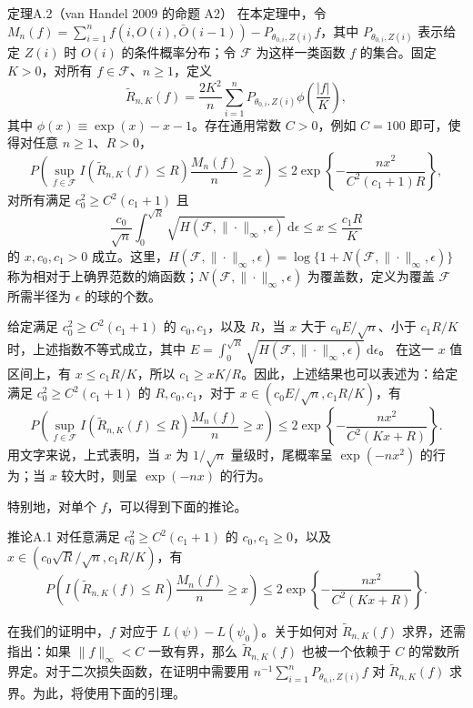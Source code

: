\begin{bookresult}{定理}{A.2（van Handel 2009 的命题 A2）}
在本定理中，令
$M_n(f)=\sum_{i=1}^n f(i,O(i),\bar O(i-1))-P_{\theta_{0,i},Z(i)}f$，其中 $P_{\theta_{0,i},Z(i)}$ 表示给定 $Z(i)$ 时 $O(i)$ 的条件概率分布；令 $\mathcal F$ 为这样一类函数 $f$ 的集合。固定 $K>0$，对所有 $f\in\mathcal F$、$n\ge1$，定义
\[
\widetilde R_{n,K}(f)
 =\frac{2K^2}{n}\sum_{i=1}^nP_{\theta_{0,i},Z(i)}
 \phi\left(\frac{|f|}{K}\right),
\]
其中 $\phi(x)\equiv\exp(x)-x-1$。存在通用常数 $C>0$，例如 $C=100$ 即可，使得对任意 $n\ge1$、$R>0$，
\[
P\left(\sup_{f\in\mathcal F}
 I(\widetilde R_{n,K}(f)\le R)\frac{M_n(f)}n\ge x\right)
 \le2\exp\left\{-\frac{nx^2}{C^2(c_1+1)R}\right\},
\]
对所有满足 $c_0^2\ge C^2(c_1+1)$ 且
\[
\frac{c_0}{\sqrt n}\int_0^{\sqrt R}
 \sqrt{H(\mathcal F,\|\cdot\|_\infty,\epsilon)}\,\mathrm d\epsilon
 \le x\le\frac{c_1R}{K}
\]
的 $x,c_0,c_1>0$ 成立。这里，$H(\mathcal F,\|\cdot\|_\infty,\epsilon)=\log\{1+N(\mathcal F,\|\cdot\|_\infty,\epsilon)\}$ 称为相对于上确界范数的熵函数；$N(\mathcal F,\|\cdot\|_\infty,\epsilon)$ 为覆盖数，定义为覆盖 $\mathcal F$ 所需半径为 $\epsilon$ 的球的个数。
\end{bookresult}

给定满足 $c_0^2\ge C^2(c_1+1)$ 的 $c_0,c_1$，以及 $R$，当 $x$ 大于 $c_0E/\sqrt n$、小于 $c_1R/K$ 时，上述指数不等式成立，其中
$E=\int_0^{\sqrt R}\sqrt{H(\mathcal F,\|\cdot\|_\infty,\epsilon)}\,\mathrm d\epsilon$。
在这一 $x$ 值区间上，有 $x\le c_1R/K$，所以 $c_1\ge xK/R$。因此，上述结果也可以表述为：给定满足 $c_0^2\ge C^2(c_1+1)$ 的 $R,c_0,c_1$，对于 $x\in(c_0E/\sqrt n,c_1R/K)$，有
\[
P\left(\sup_{f\in\mathcal F}
 I(\widetilde R_{n,K}(f)\le R)\frac{M_n(f)}n\ge x\right)
 \le2\exp\left\{-\frac{nx^2}{C^2(Kx+R)}\right\}.
\]
用文字来说，上式表明，当 $x$ 为 $1/\sqrt n$ 量级时，尾概率呈 $\exp(-nx^2)$ 的行为；当 $x$ 较大时，则呈 $\exp(-nx)$ 的行为。

特别地，对单个 $f$，可以得到下面的推论。

\begin{bookresult}{推论}{A.1}
对任意满足 $c_0^2\ge C^2(c_1+1)$ 的 $c_0,c_1\ge0$，以及 $x\in(c_0\sqrt R/\sqrt n,c_1R/K)$，有
\begin{equation}
P\left(I(\widetilde R_{n,K}(f)\le R)\frac{M_n(f)}n\ge x\right)
 \le2\exp\left\{-\frac{nx^2}{C^2(Kx+R)}\right\}.
\tag{A.6}
\end{equation}
\end{bookresult}

在我们的证明中，$f$ 对应于 $L(\psi)-L(\psi_0)$。关于如何对 $\widetilde R_{n,K}(f)$ 求界，还需指出：如果 $\|f\|_\infty<C$ 一致有界，那么 $\widetilde R_{n,K}(f)$ 也被一个依赖于 $C$ 的常数所界定。对于二次损失函数，在证明中需要用 $n^{-1}\sum_{i=1}^nP_{\theta_{0,i},Z(i)}f$ 对 $\widetilde R_{n,K}(f)$ 求界。为此，将使用下面的引理。

